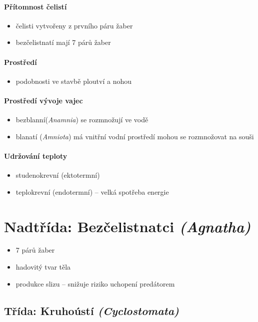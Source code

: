 \paragraph{Přítomnost čelistí}
\begin{itemize}
\item čelisti vytvořeny z prvního páru žaber
\item bezčelistnatí mají 7 párů žaber
\end{itemize}

\paragraph{Prostředí}
\begin{itemize}
\item podobnosti ve stavbě ploutví a nohou
\end{itemize}

\paragraph{Prostředí vývoje vajec}
\begin{itemize}
\item bezblanní(\textit{Anamnia}) se rozmnožují ve vodě
\item blanatí (\textit{Amniota}) má vnitřní vodní prostředí \ra mohou se rozmnožovat na souši
\end{itemize}

\paragraph{Udržování teploty}
\begin{itemize}
\item studenokrevní (ektotermní)
\item teplokrevní (endotermní) -- velká spotřeba energie
\end{itemize}

\section{Nadtřída: Bezčelistnatci \textit{(Agnatha)}}
\begin{itemize}
\item 7 párů žaber
\item hadovitý tvar těla
\item produkce slizu -- snižuje riziko uchopení predátorem
\end{itemize}

\subsection{Třída: Kruhoústí \textit{(Cyclostomata)}}
